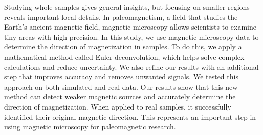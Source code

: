 Studying whole samples gives general insights, but focusing on smaller regions reveals important local details. In paleomagnetism, a field that studies the Earth's ancient magnetic field, magnetic microscopy allows scientists to examine tiny areas with high precision. In this study, we use magnetic microscopy data to determine the direction of magnetization in samples. To do this, we apply a mathematical method called Euler deconvolution, which helps solve complex calculations and reduce uncertainty. We also refine our results with an additional step that improves accuracy and removes unwanted signals. We tested this approach on both simulated and real data. Our results show that this new method can detect weaker magnetic sources and accurately determine the direction of magnetization. When applied to real samples, it successfully identified their original magnetic direction. This represents an important step in using magnetic microscopy for paleomagnetic research.